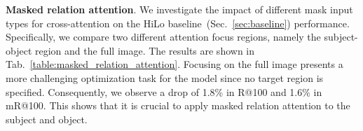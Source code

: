 \begin{table}\small
    \centering
    \vspace{+1mm}
    \caption{Ablation study for HiLo inference fusion.
    \textit{Inference fusion} refers to the method proposed in the paper to fuse the results of two branches.
    \textit{Average tensor} refers to the fusion method that directly averages the tensor output by the two branches.
}
    \vspace{-4mm}
    \label{table:inference_fusion_2}
\end{table}



\noindent \textbf{Masked relation attention}.
We investigate the impact of different mask input types for cross-attention on the HiLo baseline~(Sec.~\ref{sec:baseline}) performance.
Specifically, we compare two different attention focus regions, namely the subject-object region and the full image.
The results are shown in Tab.~\ref{table:masked_relation_attention}.
Focusing on the full image presents a more challenging optimization task for the model since no target region is specified.
Consequently, we observe a drop of 1.8\% in R@100 and 1.6\% in mR@100.
This shows that it is crucial to apply masked relation attention to the subject and object.

\begin{table}\small
    \centering
    \vspace{+1mm}
    \caption{Ablation study for masked relation attention.}
    \vspace{-10mm}
    \label{table:masked_relation_attention}
\end{table}

